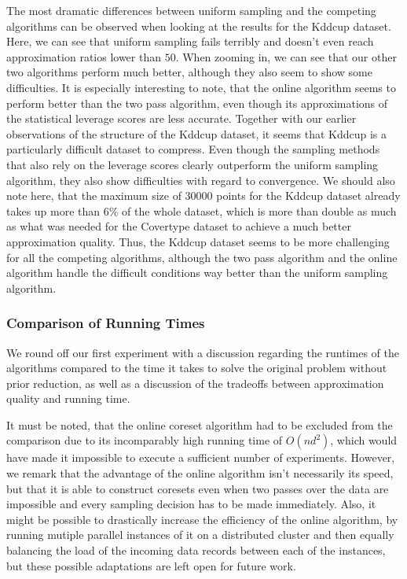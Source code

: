 The most dramatic differences between uniform sampling and the
competing algorithms can be observed when looking
at the results for the Kddcup dataset. Here, we can see that
uniform sampling fails terribly and doesn't even reach
approximation ratios lower than $50$. When zooming in, we can
see that our other two algorithms perform much better, although they
also seem to show some difficulties. It is especially interesting
to note, that the online algorithm seems to perform better than the
two pass algorithm, even though its approximations of the
statistical leverage scores are less accurate.
Together with our earlier observations of the structure of the
Kddcup dataset, it seems that Kddcup is a particularly difficult
dataset to compress. Even though the sampling methods that
also rely on the leverage scores clearly outperform the
uniform sampling algorithm, they also show difficulties with
regard to convergence. We should also note here, that the
maximum size of $30000$ points for the Kddcup dataset already
takes up more than $6\%$ of the whole dataset, which is more than
double as much as what was needed for the Covertype dataset to
achieve a much better approximation quality.
Thus, the Kddcup dataset seems to be more challenging for all the
competing algorithms, although the two pass algorithm and the
online algorithm handle the difficult conditions way better than
the uniform sampling algorithm.

\subsubsection{Comparison of Running Times}
\label{sec:running-times-comparison-ml}

We round off our first experiment with a discussion regarding the
runtimes of the algorithms compared to the time it takes to
solve the original problem without prior reduction, as well as
a discussion of the tradeoffs between approximation quality and
running time.

It must be noted, that the online coreset algorithm
had to be excluded from the comparison due to its
incomparably high running time of $O(nd^2)$, which would have
made it impossible to execute a sufficient number of experiments.
However, we remark that the advantage of the online algorithm isn't
necessarily its speed, but that it is able to construct coresets
even when two passes over the data are impossible and every sampling
decision has to be made immediately. Also, it might be possible
to drastically increase the efficiency of the online algorithm,
by running mutiple parallel instances of it on a distributed
cluster and then equally balancing the load of the incoming
data records between
each of the instances, but these possible adaptations are
left open for future work.

